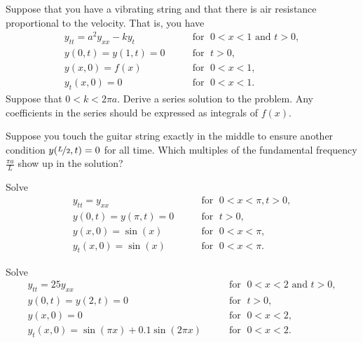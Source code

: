 \begin{exercise}[challenging]
Suppose that you have a vibrating string and that
there is air resistance proportional to the velocity.  That is, you have
\begin{equation*}
\begin{array}{ll}
y_{tt} = a^2 y_{xx} - k y_t  & \qquad \text{for } \; 0 < x < 1 \text{ and } t > 0,  \\
y(0,t) = y(1,t) = 0 & \qquad \text{for } \; t > 0, \\
y(x,0) = f(x) & \qquad \text{for } \; 0 < x < 1 , \\
y_t(x,0) = 0 & \qquad \text{for } \; 0 < x < 1 .
\end{array}
\end{equation*}
Suppose that $0 < k < 2 \pi a$.
Derive a series solution to the problem.  Any coefficients in the series
should be expressed as integrals of $f(x)$.
\end{exercise}

\begin{exercise}
Suppose you touch the guitar string exactly in the middle to
ensure another condition $y(\nicefrac{L}{2},t) = 0$ for all time.
Which multiples of the fundamental frequency $\frac{\pi a}{L}$
show up in the solution?
\end{exercise}

\setcounter{exercise}{100}

\begin{exercise}
Solve
\begin{equation*}
\begin{array}{ll}
y_{tt} = y_{xx}  & \qquad \text{for } \; 0 < x < \pi, t > 0,  \\
y(0,t) = y(\pi,t) = 0 & \qquad \text{for } \; t > 0,  \\
y(x,0) = \sin(x) & \qquad \text{for } \; 0 < x < \pi , \\
y_t(x,0) = \sin(x) & \qquad \text{for } \; 0 < x < \pi .
\end{array}
\end{equation*}
\end{exercise}

\begin{exercise}
Solve
\begin{equation*}
\begin{array}{ll}
y_{tt} = 25 y_{xx} & \qquad \text{for } \; 0 < x < 2 \text{ and } t > 0,  \\
y(0,t) = y(2,t) = 0 & \qquad \text{for } \; t > 0, \\
y(x,0) = 0 & \qquad \text{for } \; 0 < x < 2 , \\
y_t(x,0) = \sin(\pi x) + 0.1 \sin(2\pi x) & \qquad \text{for } \; 0 < x < 2 .
\end{array}
\end{equation*}
\end{exercise}

